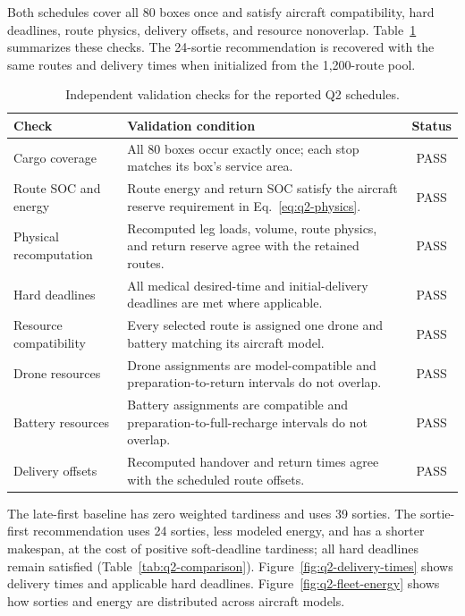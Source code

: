 \documentclass[11pt,a4paper]{article}
\begin{document}
Both schedules cover all 80 boxes once and satisfy aircraft compatibility, hard deadlines, route physics, delivery offsets, and resource nonoverlap. Table~\ref{tab:q2-validation} summarizes these checks. The 24-sortie recommendation is recovered with the same routes and delivery times when initialized from the 1,200-route pool.

\begin{table}[H]
\centering
\caption{Independent validation checks for the reported Q2 schedules.}
\label{tab:q2-validation}
\begin{tabularx}{\linewidth}{@{}lXc@{}}
\toprule
Check & Validation condition & Status\\
\midrule
Cargo coverage & All 80 boxes occur exactly once; each stop matches its box's service area. & PASS\\
Route SOC and energy & Route energy and return SOC satisfy the aircraft reserve requirement in Eq.~\eqref{eq:q2-physics}. & PASS\\
Physical recomputation & Recomputed leg loads, volume, route physics, and return reserve agree with the retained routes. & PASS\\
Hard deadlines & All medical desired-time and initial-delivery deadlines are met where applicable. & PASS\\
Resource compatibility & Every selected route is assigned one drone and battery matching its aircraft model. & PASS\\
Drone resources & Drone assignments are model-compatible and preparation-to-return intervals do not overlap. & PASS\\
Battery resources & Battery assignments are compatible and preparation-to-full-recharge intervals do not overlap. & PASS\\
Delivery offsets & Recomputed handover and return times agree with the scheduled route offsets. & PASS\\
\bottomrule
\end{tabularx}
\end{table}

The late-first baseline has zero weighted tardiness and uses 39 sorties. The sortie-first recommendation uses 24 sorties, less modeled energy, and has a shorter makespan, at the cost of positive soft-deadline tardiness; all hard deadlines remain satisfied (Table~\ref{tab:q2-comparison}). Figure~\ref{fig:q2-delivery-times} shows delivery times and applicable hard deadlines. Figure~\ref{fig:q2-fleet-energy} shows how sorties and energy are distributed across aircraft models.
\end{document}

